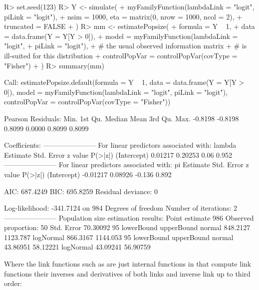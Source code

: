 \documentclass[
]{jss}
\newcommand{\1}{\mathcal{I}} \newcommand{\bx}{\boldsymbol{x}}
\begin{document}
\begin{CodeChunk}
\begin{CodeInput}
R> set.seed(123)
R> Y <- simulate(
+     myFamilyFunction(lambdaLink = "logit", piLink = "logit"),
+     nsim = 1000, eta = matrix(0, nrow = 1000, ncol = 2),
+     truncated = FALSE
+ )
R> mm <- estimatePopsize(
+     formula = Y ~ 1,
+     data = data.frame(Y = Y[Y > 0]),
+     model = myFamilyFunction(lambdaLink = "logit", 
+                              piLink = "logit"),
+     # the usual observed information matrix 
+     # is ill-suited for this distribution
+     controlPopVar = controlPopVar(covType = "Fisher")
+ )
R> summary(mm)
\end{CodeInput}
\begin{CodeOutput}

Call:
estimatePopsize.default(formula = Y ~ 1, data = data.frame(Y = Y[Y > 
    0]), model = myFamilyFunction(lambdaLink = "logit", piLink = "logit"), 
    controlPopVar = controlPopVar(covType = "Fisher"))

Pearson Residuals:
   Min. 1st Qu.  Median    Mean 3rd Qu.    Max. 
-0.8198 -0.8198  0.8099  0.0000  0.8099  0.8099 

Coefficients:
-----------------------
For linear predictors associated with: lambda 
            Estimate Std. Error z value P(>|z|)
(Intercept)  0.01217    0.20253    0.06   0.952
-----------------------
For linear predictors associated with: pi 
            Estimate Std. Error z value P(>|z|)
(Intercept) -0.01217    0.08926  -0.136   0.892

AIC: 687.4249
BIC: 695.8259
Residual deviance: 0

Log-likelihood: -341.7124 on 984 Degrees of freedom 
Number of iterations: 2
-----------------------
Population size estimation results: 
Point estimate 986
Observed proportion: 50%
Std. Error 70.30092
95%
          lowerBound upperBound
normal      848.2127   1123.787
logNormal   866.3167   1144.053
95%
          lowerBound upperBound
normal      43.86951   58.12221
logNormal   43.09241   56.90759
\end{CodeOutput}
\end{CodeChunk}

Where the link functions such as
 are just internal
functions in  that compute link functions their
inverses and derivatives of both links and inverse link up to third
order: \small
\end{document}
